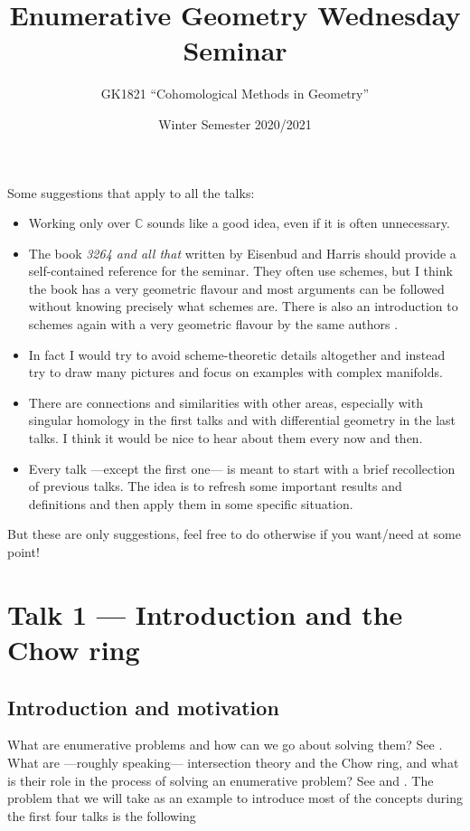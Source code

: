 \documentclass[A4paper, 12pt, british, reqno]{amsart}
\author{GK1821 ``Cohomological Methods in Geometry''}
\title[Enumerative Geometry Wednesday Seminar]{Enumerative Geometry Wednesday Seminar}
\date{Winter Semester 2020/2021}
\newcommand{\C}{\mathbb{C}} %
\theoremstyle{plain}
\theoremstyle{definition}
\theoremstyle{remark}
\theoremstyle{plain}
\theoremstyle{definition}
\theoremstyle{remark}
\theoremstyle{plain}
\theoremstyle{definition}
\theoremstyle{remark}
\begin{document}

\maketitle

\vspace{-3mm}

\tableofcontents

\vspace{-9mm}

Some suggestions that apply to all the talks:
\begin{itemize}
    \item Working only over $\C$ sounds like a good idea, even if it is often unnecessary.
    \item The book \textit{3264 and all that} written by Eisenbud and Harris \cite{eh16} should provide a self-contained reference for the seminar.
	They often use schemes, but I think the book has a very geometric flavour and most arguments can be followed without knowing precisely what schemes are.
	There is also an introduction to schemes again with a very geometric flavour by the same authors \cite{eh00}.
    \item In fact I would try to avoid scheme-theoretic details altogether and instead try to draw many pictures and focus on examples with complex manifolds.
    \item There are connections and similarities with other areas, especially with singular homology in the first talks and with differential geometry in the last talks.
	I think it would be nice to hear about them every now and then.
    \item Every talk ---except the first one--- is meant to start with a brief recollection of previous talks.
	The idea is to refresh some important results and definitions and then apply them in some specific situation.
\end{itemize}

But these are only suggestions, feel free to do otherwise if you want/need at some point!

\section{Talk 1 --- Introduction and the Chow ring}

\subsection{Introduction and motivation}
What are enumerative problems and how can we go about solving them?
See \cite[\S 3.1.1]{eh16}.
What are ---roughly speaking--- intersection theory and the Chow ring, and what is their role in the process of solving an enumerative problem?
See \cite[\S 1.1]{eh16} and \cite[\S 3.1.1]{eh16}.
The problem that we will take as an example to introduce most of the concepts during the first four talks is the following
\end{document}
